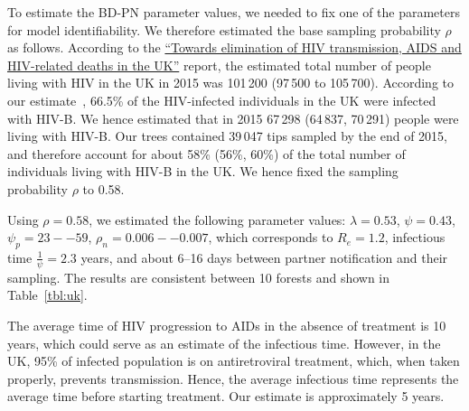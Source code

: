 \documentclass[a4paper,10pt]{article}
\begin{document}
To estimate the BD-PN parameter values, we needed to fix one of the parameters for model identifiability. We therefore estimated the base sampling probability $\rho$ as follows. According to the \href{https://webarchive.nationalarchives.gov.uk/ukgwa/20181112132123mp_/https://assets.publishing.service.gov.uk/government/uploads/system/uploads/attachment_data/file/602942/HIV_in_the_UK_report.pdf}{``Towards elimination of HIV transmission, AIDS and HIV-related deaths in the UK''}
 report, the estimated total number of people living with HIV in the UK in 2015 was 101\,200 (97\,500 to 105\,700). %
According to our estimate~\citep{zhukovaModelingDrugResistance2023}, 66.5\% of the HIV-infected individuals in the UK were infected with HIV-B. We hence estimated that in 2015 67\,298 (64\,837, 70\,291) people were living with HIV-B. Our trees contained 39\,047 tips sampled by the end of 2015, and therefore account for about 58\% (56\%, 60\%) of the total number of individuals living with HIV-B in the UK. We hence fixed the sampling probability $\rho$ to 0.58. %
 
 
Using $\rho=0.58$, we estimated the following parameter values: $\lambda=0.53$, $\psi=0.43$, $\psi_p=23--59$, $\rho_n=0.006--0.007$, which corresponds to $R_e = 1.2$, infectious time $\frac{1}{\psi} = 2.3$ years, and about 6--16 days between partner notification and their sampling. The results are consistent between 10 forests and shown in Table~\ref{tbl:uk}. %
 
The average time of HIV progression to AIDs in the absence of treatment is 10 years, which could serve as an estimate of the infectious time. However, in the UK, 95\% of infected population is on antiretroviral treatment, which, when taken properly, prevents transmission. Hence, the average infectious time represents the average time before starting treatment. Our estimate is approximately 5 years. 
\end{document}
